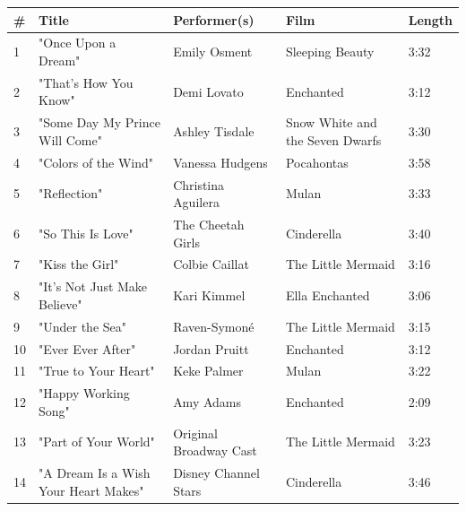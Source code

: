 \documentclass{article}
\begin{document}
\begin{tabular}{lllll}
\toprule
\# & Title & Performer(s) & Film & Length \\
\midrule
1 & "Once Upon a Dream" & Emily Osment & Sleeping Beauty & 3:32 \\
2 & "That's How You Know" & Demi Lovato & Enchanted & 3:12 \\
3 & "Some Day My Prince Will Come" & Ashley Tisdale & Snow White and the Seven Dwarfs & 3:30 \\
4 & "Colors of the Wind" & Vanessa Hudgens & Pocahontas & 3:58 \\
5 & "Reflection" & Christina Aguilera & Mulan & 3:33 \\
6 & "So This Is Love" & The Cheetah Girls & Cinderella & 3:40 \\
7 & "Kiss the Girl" & Colbie Caillat & The Little Mermaid & 3:16 \\
8 & "It's Not Just Make Believe" & Kari Kimmel & Ella Enchanted & 3:06 \\
9 & "Under the Sea" & Raven-Symoné & The Little Mermaid & 3:15 \\
10 & "Ever Ever After" & Jordan Pruitt & Enchanted & 3:12 \\
11 & "True to Your Heart" & Keke Palmer & Mulan & 3:22 \\
12 & "Happy Working Song" & Amy Adams & Enchanted & 2:09 \\
13 & "Part of Your World" & Original Broadway Cast & The Little Mermaid & 3:23 \\
14 & "A Dream Is a Wish Your Heart Makes" & Disney Channel Stars & Cinderella & 3:46 \\
\bottomrule
\end{tabular}
\end{document}
